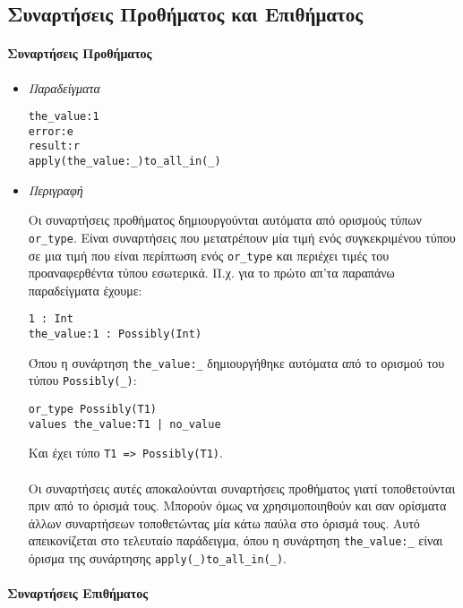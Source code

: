 \documentclass[diploma]{softlab-thesis}
\begin{document}
\newpage
\subsection{Συναρτήσεις Προθήματος και Επιθήματος}

\paragraph{Συναρτήσεις Προθήματος}

\begin{itemize}

\item \textit{Παραδείγματα}
\begin{verbatim}
the_value:1
error:e
result:r
apply(the_value:_)to_all_in(_)
\end{verbatim}

\item \textit{Περιγραφή}

Οι συναρτήσεις προθήματος δημιουργούνται αυτόματα από ορισμούς τύπων
\verb|or_type|. Είναι συναρτήσεις που μετατρέπουν μία τιμή ενός συγκεκριμένου
τύπου σε μια τιμή που είναι περίπτωση ενός \verb|or_type| και περιέχει
τιμές του προαναφερθέντα τύπου εσωτερικά.
Π.χ. για το πρώτο απ'τα παραπάνω παραδείγματα έχουμε:
\begin{verbatim}
1 : Int
the_value:1 : Possibly(Int)
\end{verbatim}
Όπου η συνάρτηση \verb|the_value:_| δημιουργήθηκε αυτόματα από το ορισμού
του τύπου \verb|Possibly(_)|:
\begin{verbatim}
or_type Possibly(T1)
values the_value:T1 | no_value
\end{verbatim}
Και έχει τύπο \verb|T1 => Possibly(T1)|.
\\\\
Οι συναρτήσεις αυτές αποκαλούνται συναρτήσεις προθήματος γιατί τοποθετούνται
πριν από το όρισμά τους. Μπορούν όμως να χρησιμοποιηθούν και σαν ορίσματα άλλων
συναρτήσεων τοποθετώντας μία κάτω παύλα στο όρισμά τους.  Αυτό απεικονίζεται
στο τελευταίο παράδειγμα, όπου η συνάρτηση \verb|the_value:_| είναι όρισμα της
συνάρτησης \verb|apply(_)to_all_in(_)|.

\end{itemize}

\newpage
\paragraph{Συναρτήσεις Επιθήματος}
\end{document}
